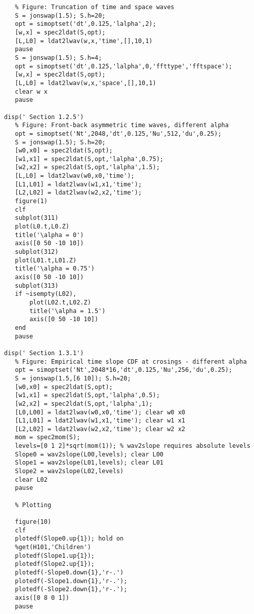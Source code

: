 {\begin{verbatim}
   % Figure: Truncation of time and space waves  
   S = jonswap(1.5); S.h=20;
   opt = simoptset('dt',0.125,'lalpha',2);
   [w,x] = spec2ldat(S,opt);
   [L,L0] = ldat2lwav(w,x,'time',[],10,1)
   pause
   S = jonswap(1.5); S.h=4;
   opt = simoptset('dt',0.125,'lalpha',0,'ffttype','fftspace');
   [w,x] = spec2ldat(S,opt);
   [L,L0] = ldat2lwav(w,x,'space',[],10,1)
   clear w x
   pause
   
disp(' Section 1.2.5')
   % Figure: Front-back asymmetric time waves, different alpha
   opt = simoptset('Nt',2048,'dt',0.125,'Nu',512,'du',0.25);
   S = jonswap(1.5); S.h=20;
   [w0,x0] = spec2ldat(S,opt);
   [w1,x1] = spec2ldat(S,opt,'lalpha',0.75);
   [w2,x2] = spec2ldat(S,opt,'lalpha',1.5);
   [L,L0] = ldat2lwav(w0,x0,'time');
   [L1,L01] = ldat2lwav(w1,x1,'time');
   [L2,L02] = ldat2lwav(w2,x2,'time');
   figure(1)
   clf
   subplot(311)
   plot(L0.t,L0.Z)
   title('\alpha = 0')
   axis([0 50 -10 10])
   subplot(312)
   plot(L01.t,L01.Z)
   title('\alpha = 0.75')
   axis([0 50 -10 10])
   subplot(313)
   if ~isempty(L02),
       plot(L02.t,L02.Z)
       title('\alpha = 1.5')
       axis([0 50 -10 10])
   end
   pause
   
disp(' Section 1.3.1')
   % Figure: Empirical time slope CDF at crosings - different alpha 
   opt = simoptset('Nt',2048*16,'dt',0.125,'Nu',256,'du',0.25);
   S = jonswap(1.5,[6 10]); S.h=20;
   [w0,x0] = spec2ldat(S,opt);
   [w1,x1] = spec2ldat(S,opt,'lalpha',0.5);
   [w2,x2] = spec2ldat(S,opt,'lalpha',1);
   [L0,L00] = ldat2lwav(w0,x0,'time'); clear w0 x0
   [L1,L01] = ldat2lwav(w1,x1,'time'); clear w1 x1
   [L2,L02] = ldat2lwav(w2,x2,'time'); clear w2 x2
   mom = spec2mom(S);
   levels=[0 1 2]*sqrt(mom(1)); % wav2slope requires absolute levels
   Slope0 = wav2slope(L00,levels); clear L00
   Slope1 = wav2slope(L01,levels); clear L01
   Slope2 = wav2slope(L02,levels)
   clear L02
   pause
   
   % Plotting
   
   figure(10)
   clf
   plotedf(Slope0.up{1}); hold on
   %get(H101,'Children')
   plotedf(Slope1.up{1});
   plotedf(Slope2.up{1}); 
   plotedf(-Slope0.down{1},'r-.')
   plotedf(-Slope1.down{1},'r-.');
   plotedf(-Slope2.down{1},'r-.'); 
   axis([0 8 0 1])
   pause
   

\end{verbatim}}
